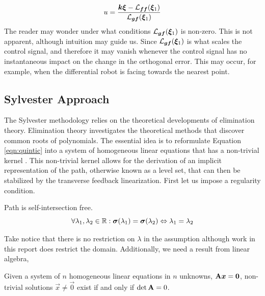 \documentclass[oneside, 11pt]{book}
\begin{document}
\begin{equation}
    u = \frac{\bm{k}\bm{\xi} - \mathcal{L}_{\bm{f}\bm{f}}(\bm{\xi}_1)}{\mathcal{L}_{\bm{g}\bm{f}}(\bm{\xi}_1)}
\end{equation}
The reader may wonder under what conditions $\mathcal{L}_{\bm{g}\bm{f}}(\bm{\xi}_1)$ is non-zero. This is not apparent, although intuition may guide us. Since $\mathcal{L}_{\bm{g}\bm{f}}(\bm{\xi}_1)$ is what scales the control signal, and therefore it may vanish whenever the control signal has no instantaneous impact on the change in the orthogonal error. This may occur, for example, when the differential robot is facing towards the nearest point.

\subsection{Sylvester Approach}
The Sylvester methodology relies on the theoretical developments of elimination theory. Elimination theory investigates the theoretical methods that discover common roots of polynomials. The essential idea is to reformulate Equation \ref{eqn:quintic} into a system of homogeneous linear equations that has a non-trivial kernel \cite{Sederberg84}. This non-trivial kernel allows for the derivation of an implicit representation of the path, otherwise known as a level set, that can then be stabilized by the transverse feedback linearization. First let us impose a regularity condition.

\begin{assumption}
    Path is self-intersection free.
    \begin{equation*}
        \forall \lambda_1, \lambda_2 \in\mathbb{R} : \bm{\sigma}(\lambda_1) = \bm{\sigma}(\lambda_2) \Leftrightarrow \lambda_1 = \lambda_2
    \end{equation*}
    \label{ass:self_intersect}
\end{assumption}

Take notice that there is no restriction on $\lambda$ in the assumption although work in this report does restrict the domain. Additionally, we need a result from linear algebra,

\begin{theorem}
    Given a system of $n$ homogeneous linear equations in $n$ unknowns, $\mathbf{A}\bm{x}=\bm{0}$, non-trivial solutions $\vec{x}\neq\vec{0}$ exist if and only if $\det\mathbf{A}=0$. \label{thm:kernel}
\end{theorem}
\end{document}

